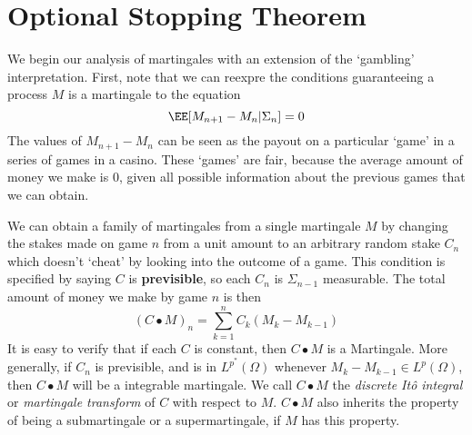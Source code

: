 \section{Optional Stopping Theorem}

We begin our analysis of martingales with an extension of the `gambling' interpretation. First, note that we can reexpre the conditions guaranteeing a process $M$ is a martingale to the equation
%
\[ \EE[M_{n+1} - M_n | \Sigma_n] = 0 \]
%
The values of $M_{n+1} - M_n$ can be seen as the payout on a particular `game' in a series of games in a casino. These `games' are fair, because the average amount of money we make is 0, given all possible information about the previous games that we can obtain.

We can obtain a family of martingales from a single martingale $M$ by changing the stakes made on game $n$ from a unit amount to an arbitrary random stake $C_n$ which doesn't `cheat' by looking into the outcome of a game. This condition is specified by saying $C$ is {\bf previsible}, so each $C_n$ is $\Sigma_{n-1}$ measurable. The total amount of money we make by game $n$ is then
%
\[ (C \bullet M)_n = \sum_{k = 1}^n C_k(M_k - M_{k-1}) \]
%
It is easy to verify that if each $C$ is constant, then $C \bullet M$ is a Martingale. More generally, if $C_n$ is previsible, and is in $L^{p^*}(\Omega)$ whenever $M_k - M_{k-1} \in L^p(\Omega)$, then $C \bullet M$ will be a integrable martingale. We call $C \bullet M$ the \emph{discrete It\^{o} integral} or \emph{martingale transform} of $C$ with respect to $M$. $C \bullet M$ also inherits the property of being a submartingale or a supermartingale, if $M$ has this property.


